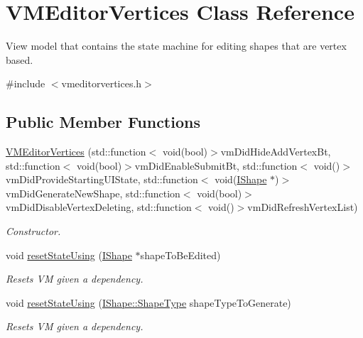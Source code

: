 \hypertarget{class_v_m_editor_vertices}{}\section{V\+M\+Editor\+Vertices Class Reference}
\label{class_v_m_editor_vertices}


View model that contains the state machine for editing shapes that are vertex based.  




{\ttfamily \#include $<$vmeditorvertices.\+h$>$}

\subsection*{Public Member Functions}
\begin{DoxyCompactItemize}
\item 
\mbox{\hyperlink{class_v_m_editor_vertices_ace292193ea7f4a08d79c590a17384c57}{V\+M\+Editor\+Vertices}} (std\+::function$<$ void(bool)$>$vm\+Did\+Hide\+Add\+Vertex\+Bt, std\+::function$<$ void(bool)$>$vm\+Did\+Enable\+Submit\+Bt, std\+::function$<$ void()$>$vm\+Did\+Provide\+Starting\+U\+I\+State, std\+::function$<$ void(\mbox{\hyperlink{class_i_shape}{I\+Shape}} $\ast$)$>$vm\+Did\+Generate\+New\+Shape, std\+::function$<$ void(bool)$>$vm\+Did\+Disable\+Vertex\+Deleting, std\+::function$<$ void()$>$vm\+Did\+Refresh\+Vertex\+List)
\begin{DoxyCompactList}\small\item\em Constructor. \end{DoxyCompactList}\item 
void \mbox{\hyperlink{class_v_m_editor_vertices_ada7b06ed4146f561c1472148a994a871}{reset\+State\+Using}} (\mbox{\hyperlink{class_i_shape}{I\+Shape}} $\ast$shape\+To\+Be\+Edited)
\begin{DoxyCompactList}\small\item\em Resets VM given a dependency. \end{DoxyCompactList}\item 
void \mbox{\hyperlink{class_v_m_editor_vertices_abe3cb316fd9c1751b0163ab137c01148}{reset\+State\+Using}} (\mbox{\hyperlink{class_i_shape_a8f50993477b5ddb44c0547ef3d547cdc}{I\+Shape\+::\+Shape\+Type}} shape\+Type\+To\+Generate)
\begin{DoxyCompactList}\small\item\em Resets VM given a dependency. \end{DoxyCompactList}\item 

\end{DoxyCompactItemize}
